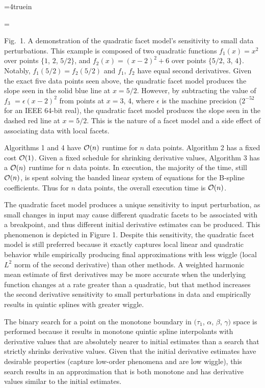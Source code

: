 \topinsert
\centerline{\epsfxsize=4truein }
{\everymath={\scriptstyle}

\narrower\noindent\rmVIII Fig.\ 1. A demonstration of the quadratic
  facet model's sensitivity to small data perturbations. This example is
  composed of two quadratic functions $f_1(x) = x^2$ over points $\{1$,
  $2$, $5/2\}$, and $f_2(x) = (x-2)^2 + 6$ over points $\{5/2$, $3$,
  $4\}$. Notably, $f_1(5/2) = f_2(5/2)$ and $f_1$, $f_2$ have
  equal second derivatives. Given the exact five data points
  seen above, the quadratic facet model produces the slope seen in the
  solid blue line at $x = 5/2$. However, by subtracting the value of
  $f_3$ $= \epsilon(x-2)^2$ from points at $x = 3$, 4, where $\epsilon$
  is the machine precision ($2^{-52}$ for an IEEE 64-bit real), the
  quadratic facet model produces the slope seen in the dashed red line
  at $x = 5/2$. This is the nature of a facet model and a side effect
  of associating data with local facets.
\par} \endinsert


Algorithms 1 and 4 have ${\cal O}(n)$ runtime for $n$ data
points. Algorithm 2 has a fixed cost ${\cal O}(1)$. Given a fixed
schedule for shrinking derivative values, Algorithm 3 has a ${\cal
  O}(n)$ runtime for $n$ data points. In execution, the majority of
the time, still ${\cal O}(n)$, is spent solving the banded linear
system of equations for the B-spline coefficients. Thus for $n$ data
points, the overall execution time is ${\cal O}(n)$.

The quadratic facet model produces a unique sensitivity to input
perturbation, as small changes in input may cause different quadratic
facets to be associated with a breakpoint, and thus different initial
derivative estimates can be produced. This phenomenon is depicted in
Figure 1. Despite this sensitivity, the quadratic facet model is still
preferred because it exactly captures local linear and quadratic
behavior while empirically producing final approximations with less
wiggle (local $L^2$ norm of the second derivative) than other methods. A
weighted harmonic mean estimate of first derivatives may be more
accurate when the underlying function changes at a rate greater than a
quadratic, but that method increases the second derivative sensitivity
to small perturbations in data and empirically results in quintic
splines with greater wiggle.

The binary search for a point on the monotone boundary in $(\tau_1$,
$\alpha$, $\beta$, $\gamma)$ space is performed because it results in
monotone quintic spline interpolants with derivative values that are
absolutely nearer to initial estimates than a search that strictly
shrinks derivative values. Given that the initial derivative estimates
have desirable properties (capture low-order phenomena and are low
wiggle), this search results in an approximation that is both monotone
and has derivative values similar to the initial estimates.

